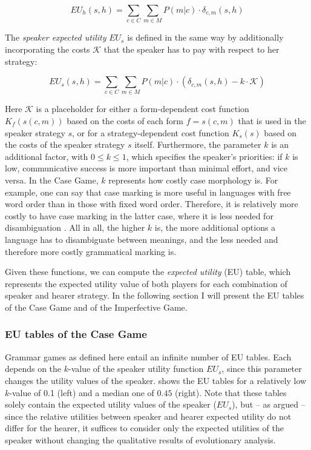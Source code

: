 \documentclass[output=paper,hidelinks]{langscibook}
\begin{document}
$$EU_h(s,h) = \sum_{c \in C}  \sum_{m \in M} P(m|c) \cdot \delta_{c,m}(s,h)$$

\noindent The \emph{speaker expected utility} $EU_s$ is defined in the same way by additionally incorporating the costs $\mathcal{K}$ that the speaker has to pay with respect to her strategy: 

$$EU_s(s,h) = \sum_{c \in C} \sum_{m \in M} P(m|c) \cdot (\delta_{c,m}(s,h) - k  \cdot \mathcal{K})$$

\noindent Here $\mathcal{K}$ is a placeholder for either a form-dependent cost function $K_f(s(c,m))$ based on the costs of each form $f=s(c,m)$ that is used in the speaker strategy $s$, or for a strategy-dependent cost function $K_s(s)$ based on the costs of the speaker strategy  $s$ itself.
Furthermore, the parameter $k$ is an additional factor, with $0 \leq k \leq 1$, which specifies the  speaker's priorities: if $k$ is low, communicative success is more important than minimal effort, and vice versa. In the Case Game, $k$ represents how costly case morphology is. For example, one can say that case marking is more useful in languages with free word order than  in those with fixed word order. Therefore, it is relatively more costly to have case marking in the latter case, where it is less needed for disambiguation \citep[see][85 for a more detailed discussion]{Jaeger07}. All in all, the higher $k$ is, the more additional options a language has to disambiguate between meanings, and the less needed and therefore more costly grammatical marking is.

Given these functions, we can compute the \emph{expected utility} (EU) table, which represents the expected utility value of both players for each combination of speaker and hearer strategy. In the following section I will present the EU tables of the Case Game and of the Imperfective Game.

\subsubsection{EU tables of the Case Game}

Grammar games as defined here entail an infinite number of EU tables. Each depends on the $k$-value of the speaker utility function $EU_s$, since this parameter changes the utility values of the speaker.  shows the EU tables for a relatively low $k$-value of 0.1 (left) and a median one of $0.45$ (right). Note that these tables solely contain the expected utility values of the speaker ($EU_s$), but -- as \citet{Jaeger07} argued -- since the relative utilities between speaker and hearer expected utility do not differ for the hearer, it suffices to consider only the expected utilities of the speaker without changing the qualitative results of evolutionary analysis.
\end{document}
